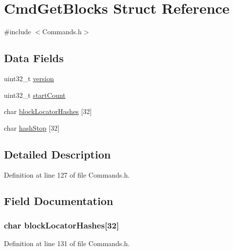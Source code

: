 \hypertarget{struct_cmd_get_blocks}{
\section{CmdGetBlocks Struct Reference}
\label{struct_cmd_get_blocks}
}


{\ttfamily \#include $<$Commands.h$>$}

\subsection*{Data Fields}
\begin{DoxyCompactItemize}
\item 
uint32\_\-t \hyperlink{struct_cmd_get_blocks_acd99bb05ca015e7d74448acb1deba7ca}{version}
\item 
uint32\_\-t \hyperlink{struct_cmd_get_blocks_a3393c33019315a8d7ff4d5e48b0577e8}{startCount}
\item 
char \hyperlink{struct_cmd_get_blocks_a95789ecf55183a47b1668d549ba4a927}{blockLocatorHashes} \mbox{[}32\mbox{]}
\item 
char \hyperlink{struct_cmd_get_blocks_aa16ea670ce42c626f461fc49f74ddcd3}{hashStop} \mbox{[}32\mbox{]}
\end{DoxyCompactItemize}


\subsection{Detailed Description}


Definition at line 127 of file Commands.h.



\subsection{Field Documentation}
\hypertarget{struct_cmd_get_blocks_a95789ecf55183a47b1668d549ba4a927}{
\subsubsection[{blockLocatorHashes}]{\setlength{\rightskip}{0pt plus 5cm}char {\bf blockLocatorHashes}\mbox{[}32\mbox{]}}}
\label{struct_cmd_get_blocks_a95789ecf55183a47b1668d549ba4a927}


Definition at line 131 of file Commands.h.

